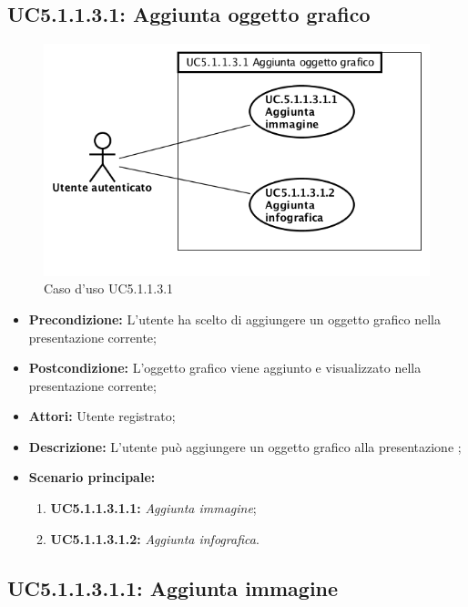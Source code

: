 \newpage
\subsection{ UC5.1.1.3.1: Aggiunta oggetto grafico}

\begin{figure}[h]
	\begin{center}
	\includegraphics[scale=0.6]{diagram/UC5-1-1-3-1.png}
	\caption{Caso d'uso UC5.1.1.3.1}
	\end{center}
\end{figure}
\begin{itemize}
	\item \textbf{Precondizione:} L'utente ha scelto di aggiungere un oggetto grafico nella presentazione corrente;
	\item \textbf{Postcondizione:} L'oggetto grafico viene aggiunto e visualizzato nella presentazione corrente;
	\item \textbf{Attori:} Utente registrato;
	\item \textbf{Descrizione:} L'utente può aggiungere un oggetto grafico alla presentazione ;
	\item \textbf{Scenario principale:}
	\begin{enumerate}
		\item \textbf{ UC5.1.1.3.1.1:} \textit{ Aggiunta immagine};
		\item \textbf{ UC5.1.1.3.1.2:} \textit{ Aggiunta infografica}.
	\end{enumerate}
\end{itemize}

\newpage
\subsection{ UC5.1.1.3.1.1: Aggiunta immagine}

